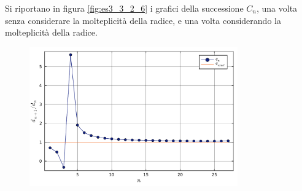 \documentclass[letterpaper, 12pt]{article}
\numberwithin{equation}{section}    %
\begin{document}
Si riportano in figura \ref{fig:es3_3_2_6} i grafici della successione $C_n$, una volta senza considerare 
la molteplicità della radice, e una volta considerando la molteplicità della radice.
\begin{figure}[!ht]
    \centering
    \begin{minipage}[b]{0.6\textwidth}
        \centering
        \includegraphics[width=0.8\textwidth]{3323_q.pdf}
        \caption*{}
    \end{minipage}
    \vspace{0.5cm}


\end{figure}
\end{document}
